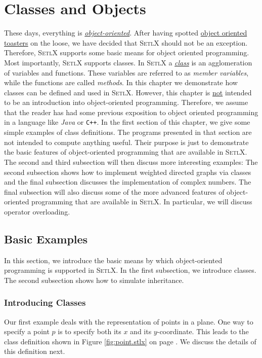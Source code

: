 \chapter{Classes and Objects}
These days, everything is
\href{http://en.wikipedia.org/wiki/Object-oriented_programming}{\emph{object-oriented}}.  
After having spotted
\href{http://www.danielsen.com/jokes/objecttoaster.txt}{object oriented toasters}  
on the loose, we have decided that \textsc{SetlX} should not be an exception.  Therefore,
\textsc{SetlX} supports some basic means for object oriented programming.  Most importantly,
\textsc{SetlX} supports classes.  In \textsc{SetlX} a  
\href{http://en.wikipedia.org/wiki/Class_(computer_programming)}{\emph{class}}
is an agglomeration of variables and functions.  These variables are referred to as 
\emph{member variables}, while the functions are called \emph{methods}.  
In this chapter we demonstrate how classes can be defined and used in \textsc{SetlX}.  
However, this chapter is \underline{not} intended to be an introduction into object-oriented
programming.  Therefore,  we assume that the reader 
has had some previous exposition to object oriented programming in a language like \textsl{Java} or
\texttt{C++}.   In the first section of this chapter, we give some simple examples of class definitions.
The programs presented in that section are not intended to compute anything useful.  Their
purpose is just to demonstrate the basic features of object-oriented programming that are available
in \textsc{SetlX}.  The second  and third subsection will then discuss more interesting examples:
The second subsection shows how to implement weighted directed graphs via classes and the final
subsection discusses the implementation of complex numbers.  The final subsection will also discuss
some of the more advanced features of object-oriented programming that are available in
\textsc{SetlX}.  In particular, we will discuss operator overloading.

\section{Basic Examples}
In this section, we introduce the basic means by which object-oriented programming is supported in
\textsc{SetlX}.  In the first subsection, we introduce classes.  The second subsection shows how to
simulate inheritance.

\subsection{Introducing Classes}
Our first example deals with the representation of points in a plane.  One way to specify a point
$p$ is to specify both its $x$ and its $y$-coordinate.  This leads to the class definition shown in
Figure \ref{fig:point.stlx} on page \pageref{fig:point.stlx}.  We discuss the details of this
definition next.

